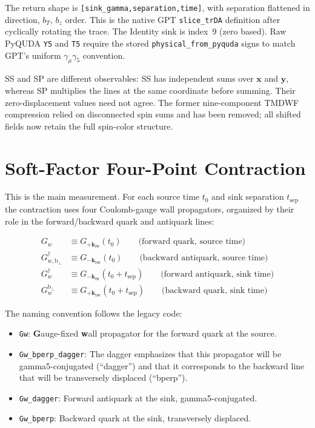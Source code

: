 \documentclass[11pt,a4paper]{article}
\newcommand{\walltag}[1]{\texttt{#1}}
\begin{document}
The return shape is \walltag{[sink\_gamma,separation,time]}, with separation
flattened in direction, $b_T$, $b_z$ order. This is the native GPT
\walltag{slice\_trDA} definition after cyclically rotating the trace.
The Identity sink is index~9 (zero based). Raw PyQUDA \walltag{Y5} and
\walltag{T5} require the stored \walltag{physical\_from\_pyquda} signs to match
GPT's uniform $\gamma_\mu\gamma_5$ convention.

SS and SP are different observables: SS has independent sums over $\mathbf x$
and $\mathbf y$, whereas SP multiplies the lines at the same coordinate before
summing. Their zero-displacement values need not agree. The former nine-component
TMDWF compression relied on disconnected spin sums and has been removed;
all shifted fields now retain the full spin-color structure.


\section{Soft-Factor Four-Point Contraction}

This is the main measurement.  For each source time $t_{0}$ and sink separation
$t_{\mathrm{sep}}$ the contraction uses four Coulomb-gauge wall propagators,
organized by their role in the forward/backward quark and antiquark lines:

\begin{equation}\label{eq:four_props}
\begin{aligned}
G_{w}            &\equiv G_{+\mathbf{k}_{\mathrm{fw}}}(t_{0})
                  \qquad\text{(forward quark, source time)} \\[2pt]
G_{w,\mathrm{b}_{\perp}}^{\dagger}
                 &\equiv G_{-\mathbf{k}_{\mathrm{bw}}}(t_{0})
                  \qquad\text{(backward antiquark, source time)} \\[2pt]
G_{w}^{\dagger}  &\equiv G_{-\mathbf{k}_{\mathrm{fw}}}(t_{0}+t_{\mathrm{sep}})
                  \qquad\text{(forward antiquark, sink time)} \\[2pt]
G_{w}^{\mathrm{b}_{\perp}}
                 &\equiv G_{+\mathbf{k}_{\mathrm{bw}}}(t_{0}+t_{\mathrm{sep}})
                  \qquad\text{(backward quark, sink time)}
\end{aligned}
\end{equation}

The naming convention follows the legacy code:

\begin{itemize}[nosep]
  \item \walltag{Gw}: \textbf{G}auge-fixed \textbf{w}all propagator for the forward
        quark at the source.
  \item \walltag{Gw\_bperp\_dagger}: The dagger emphasizes that this propagator will
        be gamma5-conjugated (``dagger'') and that it corresponds to the backward
        line that will be transversely displaced (``bperp'').
  \item \walltag{Gw\_dagger}: Forward antiquark at the sink, gamma5-conjugated.
  \item \walltag{Gw\_bperp}: Backward quark at the sink, transversely displaced.
\end{itemize}
\end{document}

